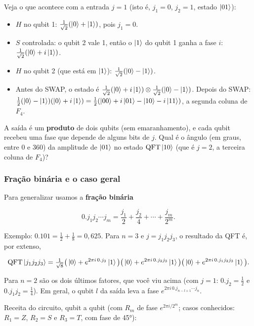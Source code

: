 Veja o que acontece com a entrada \(j=1\) (isto é, \(j_1=0\), \(j_2=1\), estado \(\left|{01}\right>\)):

\begin{itemize}
\tightlist
\item
  \(H\) no qubit 1: \(\tfrac1{\sqrt2}(\left|{0}\right>+\left|{1}\right>)\), pois \(j_1=0\).
\item
  \(S\) controlada: o qubit 2 vale 1, então o \(\left|{1}\right>\) do qubit 1 ganha a fase \(i\): \(\tfrac1{\sqrt2}(\left|{0}\right>+i\left|{1}\right>)\).
\item
  \(H\) no qubit 2 (que está em \(\left|{1}\right>\)): \(\tfrac1{\sqrt2}(\left|{0}\right>-\left|{1}\right>)\).
\item
  Antes do SWAP, o estado é \(\tfrac1{\sqrt2}(\left|{0}\right>+i\left|{1}\right>)\otimes\tfrac1{\sqrt2}(\left|{0}\right>-\left|{1}\right>)\). Depois do SWAP: \(\tfrac12(\left|{0}\right>-\left|{1}\right>)(\left|{0}\right>+i\left|{1}\right>)=\tfrac12(\left|{00}\right>+i\left|{01}\right>-\left|{10}\right>-i\left|{11}\right>)\), a segunda coluna de \(F_4\).
\end{itemize}

A saída é um \textbf{produto} de dois qubits (sem emaranhamento), e cada qubit recebeu uma fase que depende de alguns bits de \(j\). Qual é o ângulo (em graus, entre 0 e 360) da amplitude de \(\left|{01}\right>\) no estado \(\mathrm{QFT}\left|{10}\right>\) (que é \(j=2\), a terceira coluna de \(F_4\))?

\subsubsection{Fração binária e o caso geral}\label{frauxe7uxe3o-binuxe1ria-e-o-caso-geral}

Para generalizar usamos a \textbf{fração binária}

\[
0.j_1j_2\cdots j_m = \frac{j_1}{2}+\frac{j_2}{4}+\cdots+\frac{j_m}{2^m}.
\]

Exemplo: \(0.101 = \tfrac12+\tfrac18 = 0{,}625\). Para \(n=3\) e \(j=j_1j_2j_3\), o resultado da QFT é, por extenso,

\[
\mathrm{QFT}\left|{j_1j_2j_3}\right>=\tfrac1{\sqrt8}\big(\left|{0}\right>+e^{2\pi i\,0.j_3}\left|{1}\right>\big)\big(\left|{0}\right>+e^{2\pi i\,0.j_2j_3}\left|{1}\right>\big)\big(\left|{0}\right>+e^{2\pi i\,0.j_1j_2j_3}\left|{1}\right>\big).
\]

Para \(n=2\) são os dois últimos fatores, que você viu acima (com \(j=1\): \(0.j_2=\tfrac12\) e \(0.j_1j_2=\tfrac14\)). Em geral, o qubit \(l\) da saída leva a fase \(e^{2\pi i\,0.j_{n-l+1}\cdots j_n}\).

Receita do circuito, qubit a qubit (com \(R_m\) de fase \(e^{2\pi i/2^m}\); casos conhecidos: \(R_1=Z\), \(R_2=S\) e \(R_3=T\), com fase de 45°):

